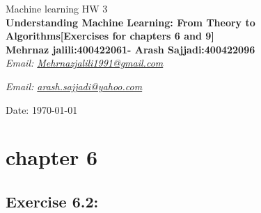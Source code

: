 \documentclass[]{book}
\begin{document}
\begin{center}
{\Large Machine learning \hspace{0.5cm} HW 3}\\
\textbf{\small{Understanding Machine Learning: From Theory to Algorithms}[Exercises for chapters 6 and 9]}\\
\textbf{Mehrnaz jalili:400422061-
Arash Sajjadi:400422096}\\ %
\textit{Email: \href{mailto:Mehrnazjalili1991@gmail.com}{Mehrnazjalili1991@gmail.com}} 

\textit{Email: \href{mailto:arash.sajjadi@yahoo.com}{arash.sajjadi@yahoo.com}} 


Date: \today %
\end{center}

\vspace{0.2 cm}

\section*{chapter 6}
\subsection*{Exercise 6.2:}
\end{document}
